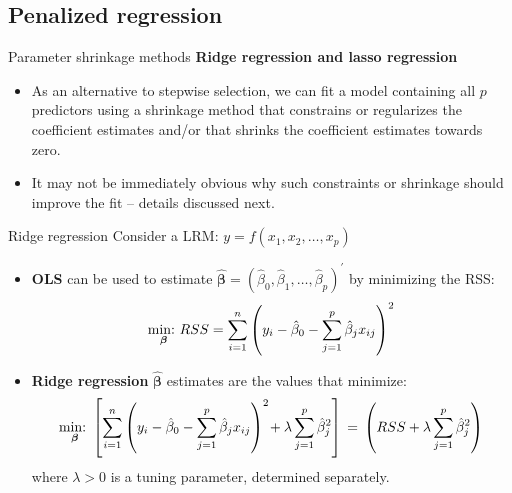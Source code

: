 \documentclass{beamer}
\begin{document}
\subsection{Penalized regression}
\begin{frame}{Parameter shrinkage methods}
\textbf{Ridge regression and lasso regression}
\medskip
\begin{itemize}
\item As an alternative to stepwise selection, we can fit a model containing all $p$ predictors using a shrinkage method that constrains or regularizes the coefficient estimates and/or that shrinks the coefficient estimates towards zero.
\medskip
\item It may not be immediately obvious why such constraints or shrinkage
should improve the fit -- details discussed next.
\end{itemize}
\end{frame}
\begin{frame}{Ridge regression}
Consider a LRM: $y = f( x_1, x_2, \dots , x_p)$

\begin{itemize}
\item \textbf{OLS} can be used to estimate $\bm{\hat{\beta}}=(\hat{\beta}_0, \hat{\beta}_1, \dots , \hat{\beta}_p)^{\prime}$ by minimizing the RSS:
$$\underset{\bm{\beta}}{\textnormal{min:~}} RSS = \sum_{i=1}^n \left(y_i - \hat{\beta}_0 
         - \sum_{j=1}^p  \hat{\beta}_j x_{ij}      \right)^2 $$
\bigskip
\item \textbf{Ridge regression} $\bm{\hat{\beta}}$ estimates 
are the values that minimize:
$$\underset{\bm{\beta}}{\textnormal{min:~}} \left[ \sum_{i=1}^n \left(y_i - \hat{\beta}_0  - \sum_{j=1}^p  \hat{\beta}_j x_{ij} \right)^2 
\! + \lambda \sum_{j=1}^p  \hat{\beta}_j^2 \right]
\, = \, \left( RSS + \lambda \sum_{j=1}^p  \hat{\beta}_j^2 \right)$$
where $\lambda > 0$ is a tuning parameter, determined separately.
\end{itemize}
\end{frame}
\end{document}
